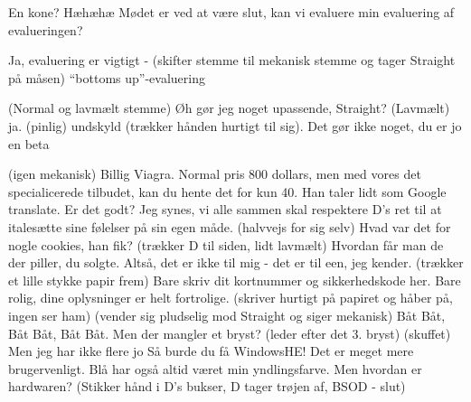\documentclass[a4paper,11pt]{article}
\begin{document}
\begin{sketch}
 En kone? Hæhæhæ
 Mødet er ved at være slut, kan vi evaluere min evaluering af evalueringen?

Ja, evaluering er vigtigt - (skifter stemme til mekanisk stemme og tager Straight på måsen) “bottoms up”-evaluering


 (Normal og lavmælt stemme) Øh gør jeg noget upassende, Straight?
 (Lavmælt) ja.
 (pinlig) undskyld (trækker hånden hurtigt til sig).
 Det gør ikke noget, du er jo en beta


 (igen mekanisk) Billig Viagra. Normal pris 800 dollars, men med vores det specialicerede tilbudet, kan du hente det for kun 40.
 Han taler lidt som Google translate. Er det godt?
 Jeg synes, vi alle sammen skal respektere D’s ret til at italesætte sine følelser på sin egen måde.
 (halvvejs for sig selv) Hvad var det for nogle cookies, han fik? 
 (trækker D til siden, lidt lavmælt) Hvordan får man de der piller, du solgte. Altså, det er ikke til mig - det er til een, jeg kender.
 (trækker et lille stykke papir frem) Bare skriv dit kortnummer og sikkerhedskode her. Bare rolig, dine oplysninger er helt fortrolige.
 (skriver hurtigt på papiret og håber på, ingen ser ham)
 (vender sig pludselig mod Straight og siger mekanisk) Båt Båt, Båt Båt, Båt Båt. Men der mangler et bryst? (leder efter det 3. bryst)
 (skuffet) Men jeg har ikke flere jo
 Så burde du få WindowsHE! Det er meget mere brugervenligt.
 Blå har også altid været min yndlingsfarve. Men hvordan er hardwaren? (Stikker hånd i D's bukser, D tager trøjen af, BSOD - slut)

\end{sketch}
\end{document}
